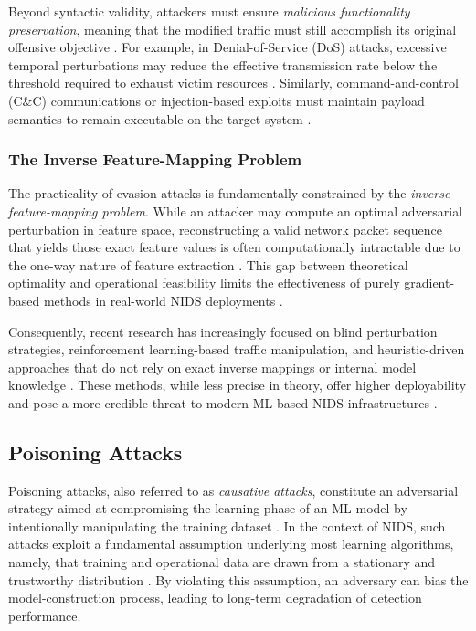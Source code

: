 Beyond syntactic validity, attackers must ensure \emph{malicious functionality preservation}, meaning that the modified traffic must still accomplish its original offensive objective \cite{li2020adversarial}. 
For example, in Denial-of-Service (DoS) attacks, excessive temporal perturbations may reduce the effective transmission rate below the threshold required to exhaust victim resources \cite{han2021evaluating}. 
Similarly, command-and-control (C\&C) communications or injection-based exploits must maintain payload semantics to remain executable on the target system \cite{cui2023cbseq, wang2024progen}.

\subsubsection{The Inverse Feature-Mapping Problem}

The practicality of evasion attacks is fundamentally constrained by the \emph{inverse feature-mapping problem}. 
While an attacker may compute an optimal adversarial perturbation in feature space, reconstructing a valid network packet sequence that yields those exact feature values is often computationally intractable due to the one-way nature of feature extraction \cite{han2021evaluating}. 
This gap between theoretical optimality and operational feasibility limits the effectiveness of purely gradient-based methods in real-world NIDS deployments \cite{debicha2023adv}.

Consequently, recent research has increasingly focused on blind perturbation strategies, reinforcement learning-based traffic manipulation, and heuristic-driven approaches that do not rely on exact inverse mappings or internal model knowledge \cite{apruzzese2024adversarial}. 
These methods, while less precise in theory, offer higher deployability and pose a more credible threat to modern ML-based NIDS infrastructures \cite{vitorino2023sok}.


\subsection{Poisoning Attacks}

Poisoning attacks, also referred to as \emph{causative attacks}, constitute an adversarial strategy aimed at compromising the learning phase of an ML model by intentionally manipulating the training dataset \cite{huang2011adversarial}. 
In the context of NIDS, such attacks exploit a fundamental assumption underlying most learning algorithms, namely, that training and operational data are drawn from a stationary and trustworthy distribution \cite{he2023adversarial}. 
By violating this assumption, an adversary can bias the model-construction process, leading to long-term degradation of detection performance.

